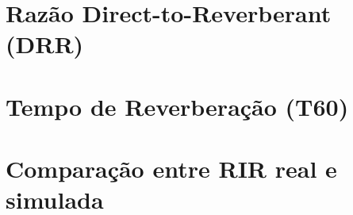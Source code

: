 \section{Razão Direct-to-Reverberant (DRR)}

\section{Tempo de Reverberação (T60)}

\section{Comparação entre RIR real e simulada}